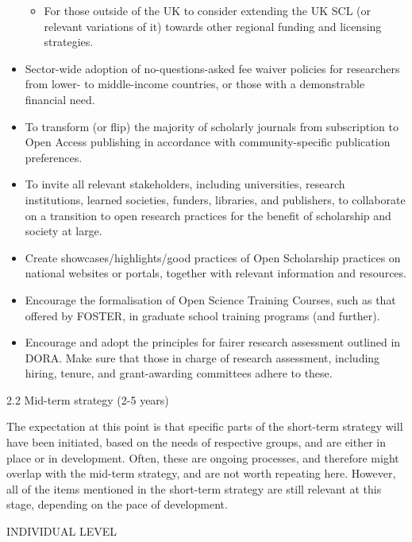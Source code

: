 \documentclass[]{article}
\providecommand{\tightlist}{%
  \setlength{\itemsep}{0pt}\setlength{\parskip}{0pt}}
\begin{document}
\begin{itemize}
  \begin{itemize}
  \tightlist
  \item
    For those outside of the UK to consider extending the UK SCL (or
    relevant variations of it) towards other regional funding and
    licensing strategies.
  \end{itemize}
\item
  Sector-wide adoption of no-questions-asked fee waiver policies for
  researchers from lower- to middle-income countries, or those with a
  demonstrable financial need.
\item
  To transform (or flip) the majority of scholarly journals from
  subscription to Open Access publishing in accordance with
  community-specific publication preferences.
\item
  To invite all relevant stakeholders, including universities, research
  institutions, learned societies, funders, libraries, and publishers,
  to collaborate on a transition to open research practices for the
  benefit of scholarship and society at large.
\item
  Create showcases/highlights/good practices of Open Scholarship
  practices on national websites or portals, together with relevant
  information and resources.
\item
  Encourage the formalisation of Open Science Training Courses, such as
  that offered by FOSTER, in graduate school training programs (and
  further).
\item
  Encourage and adopt the principles for fairer research assessment
  outlined in DORA. Make sure that those in charge of research
  assessment, including hiring, tenure, and grant-awarding committees
  adhere to these.
\end{itemize}

2.2 Mid-term strategy (2-5 years)

The expectation at this point is that specific parts of the short-term
strategy will have been initiated, based on the needs of respective
groups, and are either in place or in development. Often, these are
ongoing processes, and therefore might overlap with the mid-term
strategy, and are not worth repeating here. However, all of the items
mentioned in the short-term strategy are still relevant at this stage,
depending on the pace of development.

INDIVIDUAL LEVEL
\end{document}
